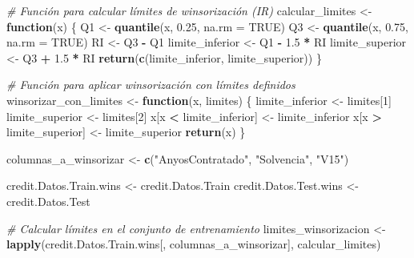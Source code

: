 \documentclass[
]{article}
\newenvironment{Shaded}{\begin{snugshade}}{\end{snugshade}}
\newcommand{\AttributeTok}[1]{\textcolor[rgb]{0.13,0.29,0.53}{#1}}
\newcommand{\CommentTok}[1]{\textcolor[rgb]{0.56,0.35,0.01}{\textit{#1}}}
\newcommand{\ConstantTok}[1]{\textcolor[rgb]{0.56,0.35,0.01}{#1}}
\newcommand{\ControlFlowTok}[1]{\textcolor[rgb]{0.13,0.29,0.53}{\textbf{#1}}}
\newcommand{\DecValTok}[1]{\textcolor[rgb]{0.00,0.00,0.81}{#1}}
\newcommand{\FloatTok}[1]{\textcolor[rgb]{0.00,0.00,0.81}{#1}}
\newcommand{\FunctionTok}[1]{\textcolor[rgb]{0.13,0.29,0.53}{\textbf{#1}}}
\newcommand{\NormalTok}[1]{#1}
\newcommand{\OtherTok}[1]{\textcolor[rgb]{0.56,0.35,0.01}{#1}}
\newcommand{\SpecialCharTok}[1]{\textcolor[rgb]{0.81,0.36,0.00}{\textbf{#1}}}
\newcommand{\StringTok}[1]{\textcolor[rgb]{0.31,0.60,0.02}{#1}}
\begin{document}
\begin{Shaded}
\begin{Highlighting}[]
\CommentTok{\# Función para calcular límites de winsorización (IR)}
\NormalTok{calcular\_limites }\OtherTok{\textless{}{-}} \ControlFlowTok{function}\NormalTok{(x) \{}
\NormalTok{  Q1 }\OtherTok{\textless{}{-}} \FunctionTok{quantile}\NormalTok{(x, }\FloatTok{0.25}\NormalTok{, }\AttributeTok{na.rm =} \ConstantTok{TRUE}\NormalTok{)}
\NormalTok{  Q3 }\OtherTok{\textless{}{-}} \FunctionTok{quantile}\NormalTok{(x, }\FloatTok{0.75}\NormalTok{, }\AttributeTok{na.rm =} \ConstantTok{TRUE}\NormalTok{)}
\NormalTok{  RI }\OtherTok{\textless{}{-}}\NormalTok{ Q3 }\SpecialCharTok{{-}}\NormalTok{ Q1}
\NormalTok{  limite\_inferior }\OtherTok{\textless{}{-}}\NormalTok{ Q1 }\SpecialCharTok{{-}} \FloatTok{1.5} \SpecialCharTok{*}\NormalTok{ RI}
\NormalTok{  limite\_superior }\OtherTok{\textless{}{-}}\NormalTok{ Q3 }\SpecialCharTok{+} \FloatTok{1.5} \SpecialCharTok{*}\NormalTok{ RI}
  \FunctionTok{return}\NormalTok{(}\FunctionTok{c}\NormalTok{(limite\_inferior, limite\_superior))}
\NormalTok{\}}

\CommentTok{\# Función para aplicar winsorización con límites definidos}
\NormalTok{winsorizar\_con\_limites }\OtherTok{\textless{}{-}} \ControlFlowTok{function}\NormalTok{(x, limites) \{}
\NormalTok{  limite\_inferior }\OtherTok{\textless{}{-}}\NormalTok{ limites[}\DecValTok{1}\NormalTok{]}
\NormalTok{  limite\_superior }\OtherTok{\textless{}{-}}\NormalTok{ limites[}\DecValTok{2}\NormalTok{]}
\NormalTok{  x[x }\SpecialCharTok{\textless{}}\NormalTok{ limite\_inferior] }\OtherTok{\textless{}{-}}\NormalTok{ limite\_inferior}
\NormalTok{  x[x }\SpecialCharTok{\textgreater{}}\NormalTok{ limite\_superior] }\OtherTok{\textless{}{-}}\NormalTok{ limite\_superior}
  \FunctionTok{return}\NormalTok{(x)}
\NormalTok{\}}

\NormalTok{columnas\_a\_winsorizar }\OtherTok{\textless{}{-}} \FunctionTok{c}\NormalTok{(}\StringTok{"AnyosContratado"}\NormalTok{, }\StringTok{"Solvencia"}\NormalTok{, }\StringTok{"V15"}\NormalTok{)}

\NormalTok{credit.Datos.Train.wins }\OtherTok{\textless{}{-}}\NormalTok{ credit.Datos.Train}
\NormalTok{credit.Datos.Test.wins }\OtherTok{\textless{}{-}}\NormalTok{ credit.Datos.Test}

\CommentTok{\# Calcular límites en el conjunto de entrenamiento}
\NormalTok{limites\_winsorizacion }\OtherTok{\textless{}{-}} \FunctionTok{lapply}\NormalTok{(credit.Datos.Train.wins[, columnas\_a\_winsorizar], calcular\_limites)}


\end{Highlighting}
\end{Shaded}
\end{document}

